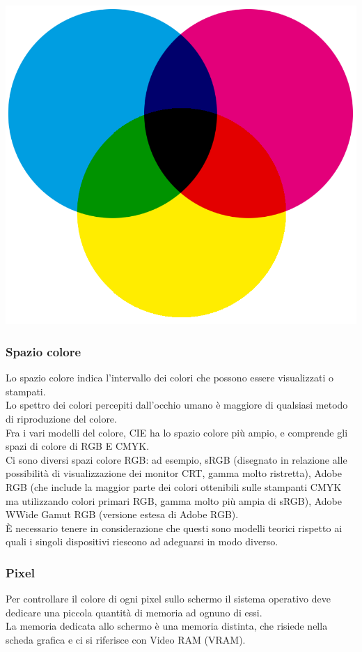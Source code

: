 \documentclass{article}
\begin{document}
\begin{enumerate}
\includegraphics[scale=0.5]{cmyk}
\end{enumerate}
\subsubsection{Spazio colore}
Lo spazio colore indica l'intervallo dei colori che possono essere visualizzati o stampati.\\
Lo spettro dei colori percepiti dall'occhio umano è maggiore di qualsiasi metodo di riproduzione del colore.\\
Fra i vari modelli del colore, CIE ha lo spazio colore più ampio, e comprende gli spazi di colore di RGB E CMYK.\\
Ci sono diversi spazi colore RGB: ad esempio, sRGB (disegnato in relazione alle possibilità di visualizzazione dei monitor CRT, gamma molto ristretta), Adobe RGB (che include la maggior parte dei colori ottenibili sulle stampanti CMYK ma utilizzando colori primari RGB, gamma molto più ampia di sRGB), Adobe WWide Gamut RGB (versione estesa di Adobe RGB).\\
È necessario tenere in considerazione che questi sono modelli teorici rispetto ai quali i singoli dispositivi riescono ad adeguarsi in modo diverso.
\subsubsection{Pixel}
Per controllare il colore di ogni pixel sullo schermo il sistema operativo deve dedicare una piccola quantità di memoria ad ognuno di essi.\\
La memoria dedicata allo schermo è una memoria distinta, che risiede nella scheda grafica e ci si riferisce con Video RAM (VRAM).\\
\end{document}
